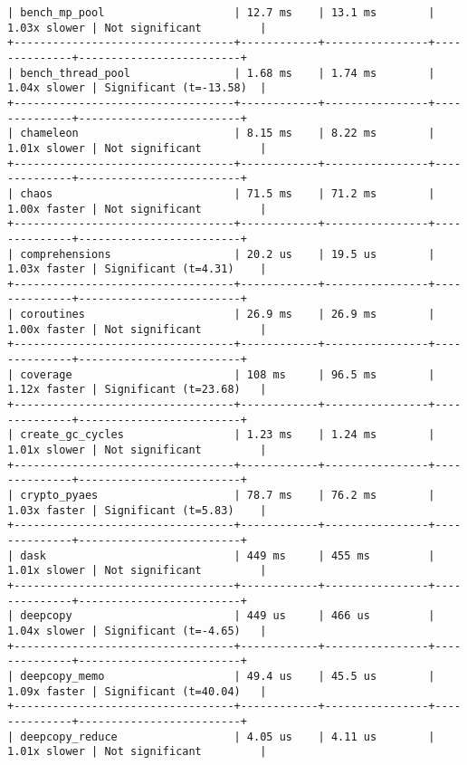 \begin{code}
\begin{verbatim}
| bench_mp_pool                    | 12.7 ms    | 13.1 ms        | 1.03x slower | Not significant         |
+----------------------------------+------------+----------------+--------------+-------------------------+
| bench_thread_pool                | 1.68 ms    | 1.74 ms        | 1.04x slower | Significant (t=-13.58)  |
+----------------------------------+------------+----------------+--------------+-------------------------+
| chameleon                        | 8.15 ms    | 8.22 ms        | 1.01x slower | Not significant         |
+----------------------------------+------------+----------------+--------------+-------------------------+
| chaos                            | 71.5 ms    | 71.2 ms        | 1.00x faster | Not significant         |
+----------------------------------+------------+----------------+--------------+-------------------------+
| comprehensions                   | 20.2 us    | 19.5 us        | 1.03x faster | Significant (t=4.31)    |
+----------------------------------+------------+----------------+--------------+-------------------------+
| coroutines                       | 26.9 ms    | 26.9 ms        | 1.00x faster | Not significant         |
+----------------------------------+------------+----------------+--------------+-------------------------+
| coverage                         | 108 ms     | 96.5 ms        | 1.12x faster | Significant (t=23.68)   |
+----------------------------------+------------+----------------+--------------+-------------------------+
| create_gc_cycles                 | 1.23 ms    | 1.24 ms        | 1.01x slower | Not significant         |
+----------------------------------+------------+----------------+--------------+-------------------------+
| crypto_pyaes                     | 78.7 ms    | 76.2 ms        | 1.03x faster | Significant (t=5.83)    |
+----------------------------------+------------+----------------+--------------+-------------------------+
| dask                             | 449 ms     | 455 ms         | 1.01x slower | Not significant         |
+----------------------------------+------------+----------------+--------------+-------------------------+
| deepcopy                         | 449 us     | 466 us         | 1.04x slower | Significant (t=-4.65)   |
+----------------------------------+------------+----------------+--------------+-------------------------+
| deepcopy_memo                    | 49.4 us    | 45.5 us        | 1.09x faster | Significant (t=40.04)   |
+----------------------------------+------------+----------------+--------------+-------------------------+
| deepcopy_reduce                  | 4.05 us    | 4.11 us        | 1.01x slower | Not significant         |

\end{verbatim}
\end{code}
